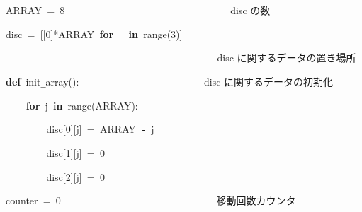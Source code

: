 \documentclass[a4paper,10pt]{article}
\def\mc{\relax}
\begin{document}
\noindent
\mbox{}ARRAY{\tt\mc \ }={\tt\mc \ }8{\tt\mc \ }{\tt\mc \ }{\tt\mc \ }{\tt\mc \ }{\tt\mc \ }{\tt\mc \ }{\tt\mc \ }{\tt\mc \ }{\tt\mc \ }{\tt\mc \ }{\tt\mc \ }{\tt\mc \ }{\tt\mc \ }{\tt\mc \ }{\tt\mc \ }{\tt\mc \ }{\tt\mc \ }{\tt\mc \ }{\tt\mc \ }{\tt\mc \ }{\tt\mc \ }{\tt\mc \ }{\tt\mc \ }{\tt\mc \ }{\tt\mc \ }{\tt\mc \ }{\tt\mc \ }{\tt\mc \ }{\tt\mc \ }{\tt\mc \ }{\tt\mc \ }\rm\mc {\tt\#} \ disc の数 \hfill 
\tt\mc 

\noindent
\mbox{}\hfill

\noindent
\mbox{}disc{\tt\mc \ }={\tt\mc \ }[[0]*ARRAY{\tt\mc \ }\textbf{for}{\tt\mc \ }{\tt\_}{\tt\mc \ }\textbf{in}{\tt\mc \ }range(3)]

\noindent
\mbox{}{\tt\mc \ }{\tt\mc \ }{\tt\mc \ }{\tt\mc \ }{\tt\mc \ }{\tt\mc \ }{\tt\mc \ }{\tt\mc \ }{\tt\mc \ }{\tt\mc \ }{\tt\mc \ }{\tt\mc \ }{\tt\mc \ }{\tt\mc \ }{\tt\mc \ }{\tt\mc \ }{\tt\mc \ }{\tt\mc \ }{\tt\mc \ }{\tt\mc \ }{\tt\mc \ }{\tt\mc \ }{\tt\mc \ }{\tt\mc \ }{\tt\mc \ }{\tt\mc \ }{\tt\mc \ }{\tt\mc \ }{\tt\mc \ }{\tt\mc \ }{\tt\mc \ }{\tt\mc \ }{\tt\mc \ }{\tt\mc \ }{\tt\mc \ }{\tt\mc \ }{\tt\mc \ }{\tt\mc \ }{\tt\mc \ }{\tt\mc \ }\rm\mc {\tt\#} \ disc に関するデータの置き場所\hfill 
\tt\mc 

\noindent
\mbox{}\hfill

\noindent
\mbox{}\textbf{def}{\tt\mc \ }init{\tt\_}array():{\tt\mc \ }{\tt\mc \ }{\tt\mc \ }{\tt\mc \ }{\tt\mc \ }{\tt\mc \ }{\tt\mc \ }{\tt\mc \ }{\tt\mc \ }{\tt\mc \ }{\tt\mc \ }{\tt\mc \ }{\tt\mc \ }{\tt\mc \ }{\tt\mc \ }{\tt\mc \ }{\tt\mc \ }{\tt\mc \ }{\tt\mc \ }{\tt\mc \ }{\tt\mc \ }{\tt\mc \ }{\tt\mc \ }\rm\mc {\tt\#} \ disc に関するデータの初期化\hfill 
\tt\mc 

\noindent
\mbox{}{\tt\mc \ }{\tt\mc \ }{\tt\mc \ }{\tt\mc \ }\textbf{for}{\tt\mc \ }j{\tt\mc \ }\textbf{in}{\tt\mc \ }range(ARRAY):

\noindent
\mbox{}{\tt\mc \ }{\tt\mc \ }{\tt\mc \ }{\tt\mc \ }{\tt\mc \ }{\tt\mc \ }{\tt\mc \ }{\tt\mc \ }disc[0][j]{\tt\mc \ }={\tt\mc \ }ARRAY{\tt\mc \ }{\tt -}{\tt\mc \ }j

\noindent
\mbox{}{\tt\mc \ }{\tt\mc \ }{\tt\mc \ }{\tt\mc \ }{\tt\mc \ }{\tt\mc \ }{\tt\mc \ }{\tt\mc \ }disc[1][j]{\tt\mc \ }={\tt\mc \ }0

\noindent
\mbox{}{\tt\mc \ }{\tt\mc \ }{\tt\mc \ }{\tt\mc \ }{\tt\mc \ }{\tt\mc \ }{\tt\mc \ }{\tt\mc \ }disc[2][j]{\tt\mc \ }={\tt\mc \ }0

\noindent
\mbox{}\hfill

\noindent
\mbox{}counter{\tt\mc \ }={\tt\mc \ }0{\tt\mc \ }{\tt\mc \ }{\tt\mc \ }{\tt\mc \ }{\tt\mc \ }{\tt\mc \ }{\tt\mc \ }{\tt\mc \ }{\tt\mc \ }{\tt\mc \ }{\tt\mc \ }{\tt\mc \ }{\tt\mc \ }{\tt\mc \ }{\tt\mc \ }{\tt\mc \ }{\tt\mc \ }{\tt\mc \ }{\tt\mc \ }{\tt\mc \ }{\tt\mc \ }{\tt\mc \ }{\tt\mc \ }{\tt\mc \ }{\tt\mc \ }{\tt\mc \ }{\tt\mc \ }{\tt\mc \ }{\tt\mc \ }\rm\mc {\tt\#} \ 移動回数カウンタ \hfill 
\tt\mc 
\end{document}
